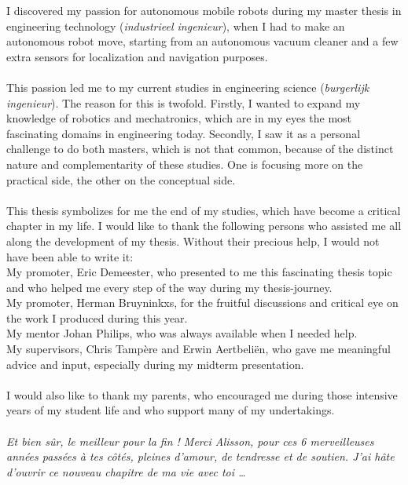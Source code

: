 \documentclass[oneside,english,master=wtk,inputenc="utf8"]{kulemt}
\begin{document}
\begin{preface}
I discovered my passion for autonomous mobile robots during my master thesis in engineering technology (\emph{industrieel ingenieur}), when I had to make an autonomous robot move, starting from an autonomous vacuum cleaner and a few extra sensors for localization and navigation purposes. 
 \\ \\
This passion led me to my current studies in engineering science (\emph{burgerlijk ingenieur}). 
The reason for this is twofold. Firstly, I wanted to expand my knowledge of robotics and mechatronics, which are in my eyes the most fascinating domains in engineering today. 
Secondly, I saw it as a personal challenge to do both masters, which is not that common, because of the distinct nature and complementarity of these studies. One is focusing more on the practical side, the other on the conceptual side.
 \\ \\
This thesis symbolizes for me the end of my studies, which have become a critical chapter in my life. I would like to thank the following persons who assisted me all along the development of my thesis.  Without their precious help, I would not have been able to write it:
\\
My promoter, Eric Demeester, who presented to me this fascinating thesis topic and who helped me every step of the way during my thesis-journey.
\\
My promoter, Herman Bruyninkxs, for the fruitful discussions and critical eye on the work I produced during this year.
\\
My mentor Johan Philips, who was always available when I needed help.
\\
My supervisors, Chris Tampère and Erwin Aertbeliën, who gave me meaningful advice and input, especially during my midterm presentation.
 \\ \\
I would also like to thank my parents, who encouraged me during those intensive years of my student life and who support many of my undertakings.
 \\ \\
\emph{Et bien sûr, le meilleur pour la fin ! Merci Alisson, pour ces 6 merveilleuses années passées à tes côtés, pleines d'amour, de tendresse et de soutien. J'ai hâte d'ouvrir ce nouveau chapitre de ma vie avec toi \dots}
\end{preface}
\end{document}
